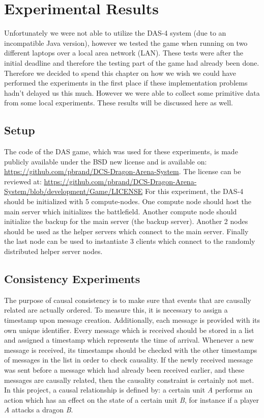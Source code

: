 \section{Experimental Results}
Unfortunately we were not able to utilize the DAS-4 system (due to an incompatible Java version), however we tested the game when running on two different laptops over a local area network (LAN). These tests were after the initial deadline and therefore the testing part of the game had already been done. Therefore we decided to spend this chapter on how we wish we could have performed the experiments in the first place if these implementation problems hadn't delayed us this much. However we were able to collect some primitive data from some local experiments. These results will be discussed here as well.

\subsection{Setup}
The code of the DAS game, which was used for these experiments, is made publicly available under the BSD new license and is available on: \url{https://github.com/pbrand/DCS-Dragon-Arena-System}. 
The license can be reviewed at: \url{https://github.com/pbrand/DCS-Dragon-Arena-System/blob/development/Game/LICENSE}
For this experiment, the DAS-4 should be initialized with 5 compute-nodes. 
One compute node should host the main server which initializes the battlefield. 
Another compute node should initialize the backup for the main server (the backup server). 
Another 2 nodes should be used as the helper servers which connect to the main server. 
Finally the last node can be used to instantiate 3 clients which connect to the randomly distributed helper server nodes.

\subsection{Consistency Experiments}
The purpose of causal consistency is to make sure that events that are causally related are actually ordered. 
To measure this, it is necessary to assign a timestamp upon message creation. 
Additionally, each message is provided with its own unique identifier. 
Every message which is received should be stored in a list and assigned a timestamp which represents the time of arrival.
Whenever a new message is received, its timestamps should be checked with the other timestamps of messages in the list in order to check causality. If the newly received message was sent before a message which had already been received earlier, and these messages are causally related, then the causality constraint is certainly not met.
In this project, a causal relationship is defined by: a certain unit \emph{A} performs an action which has an effect on the state of a certain unit \emph{B}, for instance if a player \emph{A} attacks a dragon \emph{B}.

